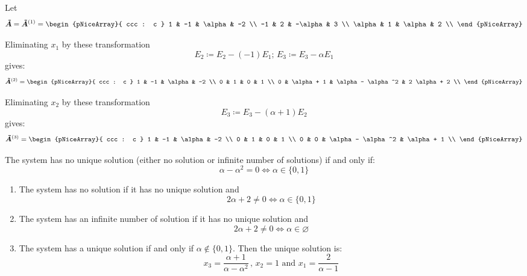 \documentclass[../../../../Assignments]{subfiles}
\begin{document}
\begin{solution}
    Let
    \[
        \bm{\tilde{A}} = \bm{\tilde{A}}^{(1)} =
            \begin{pNiceArray}{ ccc : c }
                    1   &  -1  &   \alpha  &  -2  \\
                   -1   &   2  &  -\alpha  &   3  \\
                \alpha  &   1  &   \alpha  &   2  \\
            \end{pNiceArray}
    \]

    Eliminating \(x_1\) by these transformation
    \[E_2 \coloneqq E_2 - (-1) E_1; \, E_3 \coloneqq E_3 - \alpha E_1\]
    gives:
    \[
        \bm{\tilde{A}}^{(2)} =
            \begin{pNiceArray}{ ccc : c }
                1  &      -1      &        \alpha       &       -2       \\
                0  &       1      &           0         &        1       \\
                0  &  \alpha + 1  &  \alpha - \alpha^2  &  2 \alpha + 2  \\
            \end{pNiceArray}
    \]

    Eliminating \(x_2\) by these transformation
    \[E_3 \coloneqq E_3 - (\alpha + 1) E_2\]
    gives:
    \[
        \bm{\tilde{A}}^{(3)} =
            \begin{pNiceArray}{ ccc : c }
                1  &  -1  &        \alpha       &      -2      \\
                0  &   1  &           0         &       1      \\
                0  &   0  &  \alpha - \alpha^2  &  \alpha + 1  \\
            \end{pNiceArray}
    \]

    The system has no unique solution (either no solution or infinite number of
    solutions) if and only if:
    \[\alpha - \alpha^2 = 0 \iff \alpha \in \{0, 1\}\]

    \begin{enumerate}[label = \alph*)]
        \item The system has no solution if it has no unique solution and
            \[2 \alpha + 2 \neq 0 \iff \alpha \in \{0, 1\}\]

        \item The system has an infinite number of solution if it has no unique
            solution and
            \[2 \alpha + 2 \neq 0 \iff \alpha \in \varnothing\]

        \item The system has a unique solution if and only if \(\alpha \notin
            \{0, 1\}\). Then the unique solution is:
            \[x_3 = \frac{\alpha + 1}{\alpha - \alpha^2} \, \text{, } x_2 = 1 \text{ and } x_1 = \frac{2}{\alpha - 1}\]
    \end{enumerate}
\end{solution}
\end{document}
